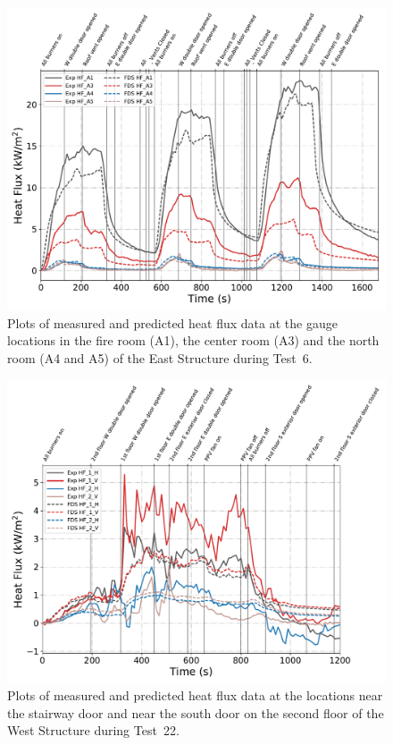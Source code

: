 \begin{figure}[!h]
	\centering
	\includegraphics[width=\columnwidth]{Figures/Plots/Validation/Heat_Flux/Test_6_HFs}
	\caption[Plots of measured and predicted heat flux data during Test~6.]{Plots of measured and predicted heat flux data at the gauge locations in the fire room (A1), the center room (A3) and the north room (A4 and A5) of the East Structure during Test~6.}
	\label{fig:Test6_HFs}
\end{figure}

\begin{figure}[!h]
	\centering
	\includegraphics[width=\columnwidth]{Figures/Plots/Validation/Heat_Flux/Test_22_HFs}
	\caption[Plots of measured and predicted heat flux data during Test~22.]{Plots of measured and predicted heat flux data at the locations near the stairway door and near the south door on the second floor of the West Structure during Test~22.}
	\label{fig:Test22_HFs}
\end{figure}

